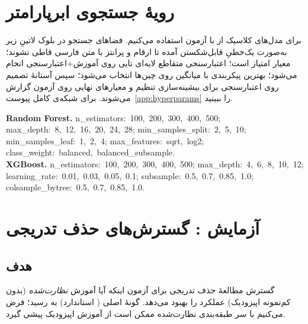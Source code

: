 \section{رویۀ جستجوی ابرپارامتر}

برای مدل‌های کلاسیک از  با  آزمون استفاده می‌کنیم. فضاهای جستجو در بلوک لاتینِ زیر به‌صورت یک‌خطیِ قابل‌شکستن آمده تا ارقام و پرانتز با متن فارسی قاطی نشوند؛ معیار امتیاز  است؛ اعتبارسنجی متقاطع لایه‌ای ‌تایی روی آموزش+اعتبارسنجی انجام می‌شود؛ بهترین پیکربندی با میانگین  روی چین‌ها انتخاب می‌شود؛ سپس آستانۀ تصمیم روی اعتبارسنجی برای بیشینه‌سازی  تنظیم و معیارهای نهایی روی آزمون گزارش می‌شوند. برای شبکه‌ی کامل پیوست~\ref{app:hyperparams} را ببینید.

\begin{latin}\footnotesize\setlength{\parskip}{0.35em}\setlength{\parindent}{0pt}\ttfamily\sloppy\raggedright
\textbf{Random Forest.}\quad
n\_estimators:\ 100,\ 200,\ 300,\ 400,\ 500;\quad
max\_depth:\ 8,\ 12,\ 16,\ 20,\ 24,\ 28;\quad
min\_samples\_split:\ 2,\ 5,\ 10;\quad
min\_samples\_leaf:\ 1,\ 2,\ 4;\quad
max\_features:\ sqrt,\ log2;\quad
class\_weight:\ balanced,\ balanced\_subsample.\\[-0.1em]
\textbf{XGBoost.}\quad
n\_estimators:\ 100,\ 200,\ 300,\ 400,\ 500;\quad
max\_depth:\ 4,\ 6,\ 8,\ 10,\ 12;\quad
learning\_rate:\ 0{.}01,\ 0{.}03,\ 0{.}05,\ 0{.}1;\quad
subsample:\ 0{.}5,\ 0{.}7,\ 0{.}85,\ 1{.}0;\quad
colsample\_bytree:\ 0{.}5,\ 0{.}7,\ 0{.}85,\ 1{.}0.
\end{latin}

\section{آزمایش : گسترش‌های حذف تدریجی }
\label{sec:ethos-ablation}

\subsection{هدف}

گسترش مطالعۀ حذف تدریجی برای آزمون اینکه آیا آموزش \emph{نظارت‌شده} (بدون کم‌نمونه اپیزودیک) عملکرد  را بهبود می‌دهد. گونۀ اصلی \texttt{} ( استاندارد) به   رسید؛ فرض می‌کنیم  با سر طبقه‌بندی نظارت‌شده ممکن است از آموزش اپیزودیک پیشی گیرد.

